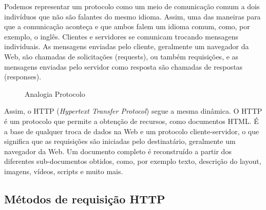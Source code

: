 Podemos representar um protocolo como um meio de comunicação comum a dois indivíduos que não são falantes do mesmo idioma. Assim, uma das maneiras para que a comunicação aconteça e que ambos falem um idioma comum, como, por exemplo, o inglês. Clientes e servidores se comunicam trocando mensagens individuais. As mensagens enviadas pelo cliente, geralmente um navegador da Web, são chamadas de solicitações (requests), ou também requisições, e as mensagens enviadas pelo servidor como resposta são chamadas de respostas (responses).

\begin{figure}[H]
	\centering
	\caption{Analogia Protocolo}
	\label{fig:protocolo}
\end{figure}

Assim, o HTTP (\textit{Hypertext Transfer Protocol}) segue a mesma dinâmica. O HTTP é um protocolo que permite a obtenção de recursos, como documentos HTML. É a base de qualquer troca de dados na Web e um protocolo cliente-servidor, o que significa que as requisições são iniciadas pelo destinatário, geralmente um navegador da Web. Um documento completo é reconstruído a partir dos diferentes sub-documentos obtidos, como, por exemplo texto, descrição do layout, imagens, vídeos, scripts e muito mais.

\subsection{Métodos de requisição HTTP}

